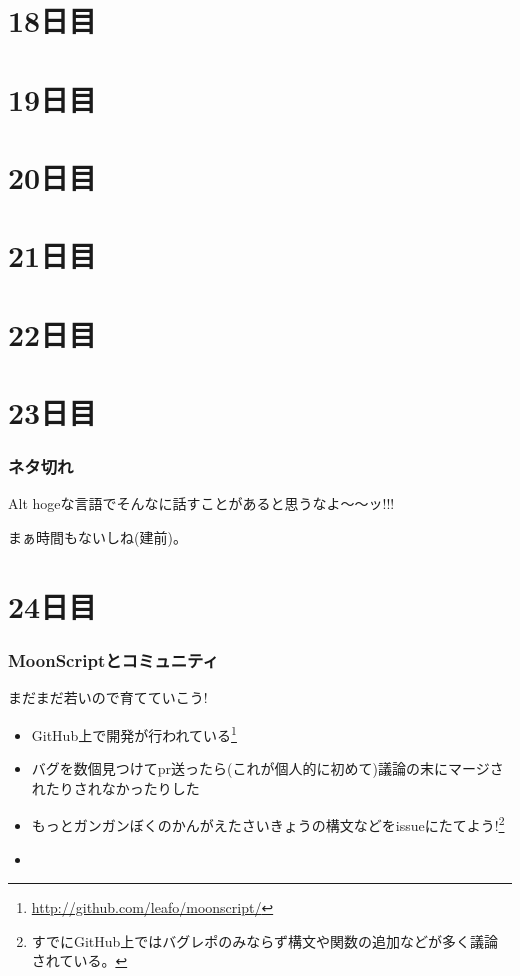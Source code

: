 \section{18日目}
\section{19日目}
\section{20日目}
\section{21日目}
\section{22日目}
\section{23日目}
\begin{frame}
	\frametitle{ネタ切れ}
	\alert{\Huge{}Alt hogeな言語でそんなに話すことがあると思うなよ〜〜ッ!!!}

	まぁ時間もないしね(建前)。
\end{frame}
\section{24日目}
\begin{frame}
	\frametitle{MoonScriptとコミュニティ}

	\alert{まだまだ若いので育てていこう!}

	\begin{itemize}
		\item GitHub上で開発が行われている\footnote[frame]{\url{http://github.com/leafo/moonscript/}}
		\item バグを数個見つけてpr送ったら(これが個人的に初めて)議論の末にマージされたりされなかったりした
		\item もっとガンガンぼくのかんがえたさいきょうの構文などをissueにたてよう!\footnote[frame]{すでにGitHub上ではバグレポのみならず構文や関数の追加などが多く議論されている。}
		\item {}
	\end{itemize}
\end{frame}
